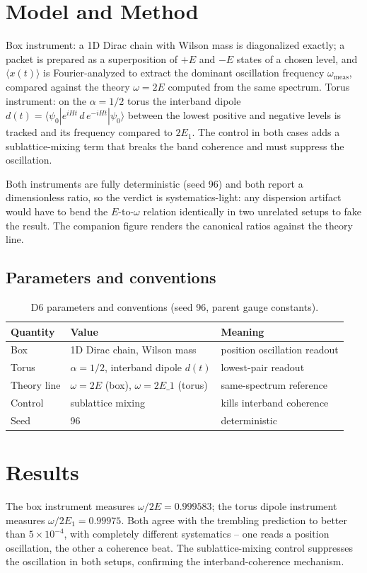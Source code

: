 \documentclass[11pt,a4paper]{article}
\begin{document}
\section{Model and Method}
Box instrument: a 1D Dirac chain with Wilson mass is diagonalized exactly; a packet is prepared as a superposition of $+E$ and $-E$ states of a chosen level, and $\langle x(t)\rangle$ is Fourier-analyzed to extract the dominant oscillation frequency $\omega_{\mathrm{meas}}$, compared against the theory $\omega = 2E$ computed from the same spectrum. Torus instrument: on the $\alpha = 1/2$ torus the interband dipole $d(t) = \langle\psi_0| e^{iHt}\, \hat{d}\, e^{-iHt} |\psi_0\rangle$ between the lowest positive and negative levels is tracked and its frequency compared to $2E_1$. The control in both cases adds a sublattice-mixing term that breaks the band coherence and must suppress the oscillation.

Both instruments are fully deterministic (seed 96) and both report a dimensionless ratio, so the verdict is systematics-light: any dispersion artifact would have to bend the $E$-to-$\omega$ relation identically in two unrelated setups to fake the result. The companion figure renders the canonical ratios against the theory line.

\subsection{Parameters and conventions}
\begin{table}[htbp]\centering\small
\begin{tabularx}{\columnwidth}{@{}l l X@{}}
\toprule
Quantity & Value & Meaning \\
\midrule
Box & 1D Dirac chain, Wilson mass & position oscillation readout \\
Torus & $\alpha = 1/2$, interband dipole $d(t)$ & lowest-pair readout \\
Theory line & $\omega = 2E$ (box), $\omega = 2E\_1$ (torus) & same-spectrum reference \\
Control & sublattice mixing & kills interband coherence \\
Seed & 96 & deterministic \\
\bottomrule
\end{tabularx}
\caption{D6 parameters and conventions (seed 96, parent gauge constants).}
\end{table}

\section{Results}
The box instrument measures $\omega/2E = 0.999583$; the torus dipole instrument measures $\omega/2E_1 = 0.99975$. Both agree with the trembling prediction to better than $5\times10^{-4}$, with completely different systematics -- one reads a position oscillation, the other a coherence beat. The sublattice-mixing control suppresses the oscillation in both setups, confirming the interband-coherence mechanism.
\end{document}
